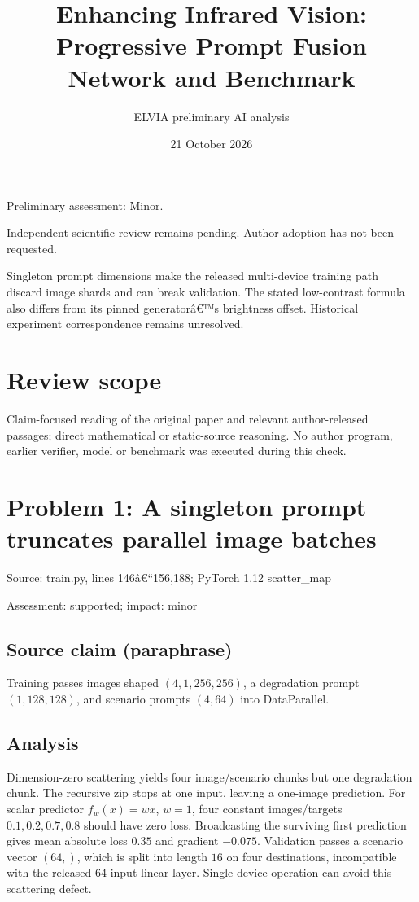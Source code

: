 \documentclass[11pt]{article}
\begin{document}
\title{Enhancing Infrared Vision: Progressive Prompt Fusion Network and Benchmark}

\author{ELVIA preliminary AI analysis}\date{21 October 2026}\maketitle

Preliminary assessment: Minor.\par

Independent scientific review remains pending. Author adoption has not been requested.

Singleton prompt dimensions make the released multi-device training path discard image shards and can break validation. The stated low-contrast formula also differs from its pinned generatorâ€™s brightness offset. Historical experiment correspondence remains unresolved.

\section*{Review scope}

Claim-focused reading of the original paper and relevant author-released passages; direct mathematical or static-source reasoning. No author program, earlier verifier, model or benchmark was executed during this check.

\section*{Problem 1: A singleton prompt truncates parallel image batches}

Source: train.py, lines 146â€“156,188; PyTorch 1.12 scatter\_map

Assessment: supported; impact: minor

\subsection*{Source claim (paraphrase)}

Training passes images shaped \((4,1,256,256)\), a degradation prompt \((1,128,128)\), and scenario prompts \((4,64)\) into DataParallel.

\subsection*{Analysis}

Dimension-zero scattering yields four image/scenario chunks but one degradation chunk. The recursive zip stops at one input, leaving a one-image prediction. For scalar predictor \(f_w(x)=wx\), \(w=1\), four constant images/targets \(0.1,0.2,0.7,0.8\) should have zero loss. Broadcasting the surviving first prediction gives mean absolute loss \(0.35\) and gradient \(-0.075\). Validation passes a scenario vector \((64,)\), which is split into length \(16\) on four destinations, incompatible with the released \(64\)-input linear layer. Single-device operation can avoid this scattering defect.
\end{document}
